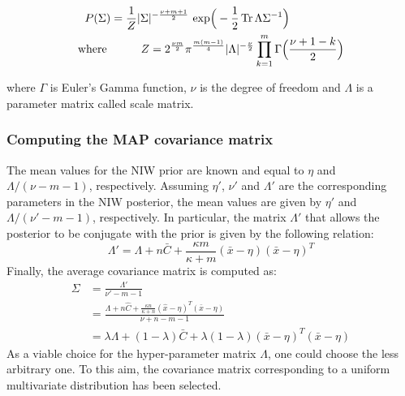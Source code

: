             \begin{equation}  %
                \begin{split}  %
                    P(\Sigma) & = \frac{1}{Z} \vert\Sigma\vert^{-\frac{\nu + m + 1}{2}} \exp{-\frac{1}{2} \trace{\Lambda \Sigma^{-1}}} \\
                    \text{where } & \ \ \ \ \ \ \ \ Z = 2^{\frac {\nu m}{2}} \pi^{\frac{m (m - 1)}{4}} \vert\Lambda\vert^{-\frac \nu2}
                    \prod\limits_{k=1}^{m} \Gamma\Big(\frac{\nu + 1 - k}{2}\Big)
                \end{split}
            \end{equation}

            where $\Gamma$ is Euler's Gamma function, $\nu$ is the degree of freedom and $\Lambda$ is a parameter matrix called scale matrix.

        \subsubsection{Computing the MAP covariance matrix}

            The mean values for the NIW prior are known and equal to $\eta$ and $\Lambda / (\nu - m - 1)$, respectively.  %
            Assuming $\eta'$, $\nu'$ and $\Lambda'$ are the corresponding parameters in the NIW posterior, the mean values are given by
            $\eta'$ and $\Lambda / (\nu' - m - 1)$, respectively. In particular, the matrix $\Lambda'$ that allows the posterior to be conjugate
            with the prior is given by the following relation:
            \begin{equation}
                \Lambda' = \Lambda + n \bar{C} + \frac{\kappa m}{\kappa + m} (\bar{x} - \eta) (\bar{x} - \eta)^T
            \end{equation}
            Finally, the average covariance matrix is computed as:
            \begin{align*}
                \Sigma & = \frac{\Lambda'}{\nu' - m - 1} \\
                & = \frac{\Lambda + n \hat{C} + \frac{\kappa n}{\kappa + n} (\hat{x} - \eta)^T (\bar{x} - \eta)}{\nu + n - m -1} \\  %
                & = \lambda \Lambda + (1 - \lambda) \bar{C} + \lambda (1 - \lambda) (\bar{x} - \eta)^T (\bar{x} - \eta)
            \end{align*}
            As a viable choice for the hyper-parameter matrix $\Lambda$, one could choose the less arbitrary one. To this aim, the covariance
            matrix corresponding to a uniform multivariate distribution has been selected.
